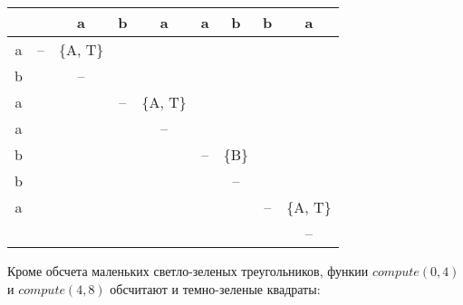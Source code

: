 \documentclass[russian,table]{article}
\begin{document}
\begin{table}[h]
\centering
\begin{tabular}{c|cccccccc}
 &  & a & b & a & a & b & b & a \\ \hline
a & \cellcolor[HTML]{00FF00}-- & \cellcolor[HTML]{00FF00}\{A, T\} & \cellcolor[HTML]{009901} & \cellcolor[HTML]{009901} & \cellcolor[HTML]{FD6864} & \cellcolor[HTML]{FD6864} & \cellcolor[HTML]{FD6864} & \cellcolor[HTML]{FD6864} \\
b &  & \cellcolor[HTML]{00FF00}-- & \cellcolor[HTML]{009901} & \cellcolor[HTML]{009901} & \cellcolor[HTML]{FD6864} & \cellcolor[HTML]{FD6864} & \cellcolor[HTML]{FD6864} & \cellcolor[HTML]{FD6864} \\
a &  &  & \cellcolor[HTML]{00FF00}-- & \cellcolor[HTML]{00FF00}\{A, T\} & \cellcolor[HTML]{FD6864} & \cellcolor[HTML]{FD6864} & \cellcolor[HTML]{FD6864} & \cellcolor[HTML]{FD6864} \\
a &  &  &  & \cellcolor[HTML]{00FF00}-- & \cellcolor[HTML]{FD6864} & \cellcolor[HTML]{FD6864} & \cellcolor[HTML]{FD6864} & \cellcolor[HTML]{FD6864} \\
b &  &  &  &  & \cellcolor[HTML]{00FF00}-- & \cellcolor[HTML]{00FF00}\{B\} & \cellcolor[HTML]{009901} & \cellcolor[HTML]{009901} \\
b &  &  &  &  &  & \cellcolor[HTML]{00FF00}-- & \cellcolor[HTML]{009901} & \cellcolor[HTML]{009901} \\
a &  &  &  &  &  &  & \cellcolor[HTML]{00FF00}-- & \cellcolor[HTML]{00FF00}\{A, T\} \\
 &  &  &  &  &  &  &  & \cellcolor[HTML]{00FF00}--
\end{tabular}
\end{table}

Кроме обсчета маленьких светло-зеленых треугольников, функии $compute(0, 4)$ и $compute(4, 8)$ обсчитают и темно-зеленые квадраты:
\end{document}
